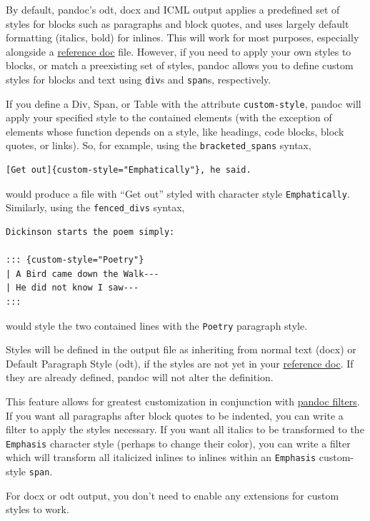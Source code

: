 \documentclass[
]{article}
\begin{document}
By default, pandoc's odt, docx and ICML output applies a predefined set
of styles for blocks such as paragraphs and block quotes, and uses
largely default formatting (italics, bold) for inlines. This will work
for most purposes, especially alongside a
\protect\hyperlink{option--reference-doc}{reference doc} file. However,
if you need to apply your own styles to blocks, or match a preexisting
set of styles, pandoc allows you to define custom styles for blocks and
text using \texttt{div}s and \texttt{span}s, respectively.

If you define a Div, Span, or Table with the attribute
\texttt{custom-style}, pandoc will apply your specified style to the
contained elements (with the exception of elements whose function
depends on a style, like headings, code blocks, block quotes, or links).
So, for example, using the \texttt{bracketed\_spans} syntax,

\begin{verbatim}
[Get out]{custom-style="Emphatically"}, he said.
\end{verbatim}

would produce a file with ``Get out'' styled with character style
\texttt{Emphatically}. Similarly, using the \texttt{fenced\_divs}
syntax,

\begin{verbatim}
Dickinson starts the poem simply:

::: {custom-style="Poetry"}
| A Bird came down the Walk---
| He did not know I saw---
:::
\end{verbatim}

would style the two contained lines with the \texttt{Poetry} paragraph
style.

Styles will be defined in the output file as inheriting from normal text
(docx) or Default Paragraph Style (odt), if the styles are not yet in
your \protect\hyperlink{option--reference-doc}{reference doc}. If they
are already defined, pandoc will not alter the definition.

This feature allows for greatest customization in conjunction with
\href{https://pandoc.org/filters.html}{pandoc filters}. If you want all
paragraphs after block quotes to be indented, you can write a filter to
apply the styles necessary. If you want all italics to be transformed to
the \texttt{Emphasis} character style (perhaps to change their color),
you can write a filter which will transform all italicized inlines to
inlines within an \texttt{Emphasis} custom-style \texttt{span}.

For docx or odt output, you don't need to enable any extensions for
custom styles to work.
\end{document}
